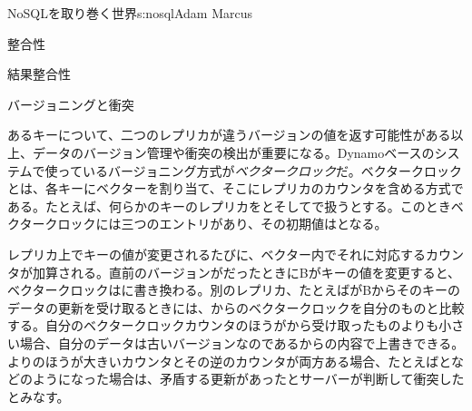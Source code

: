 \begin{aosachapter}{NoSQLを取り巻く世界}{s:nosql}{Adam Marcus}
\begin{aosasect1}{整合性}
\begin{aosasect2}{結果整合性}
\begin{aosasect3}{バージョニングと衝突}

あるキーについて、二つのレプリカが違うバージョンの値を返す可能性がある以上、データのバージョン管理や衝突の検出が重要になる。Dynamoベースのシステムで使っているバージョニング方式が\emph{ベクタークロック}だ。ベクタークロックとは、各キーにベクターを割り当て、そこにレプリカのカウンタを含める方式である。たとえば、何らかのキーのレプリカをとそしてで扱うとする。このときベクタークロックには三つのエントリがあり、その初期値はとなる。

レプリカ上でキーの値が変更されるたびに、ベクター内でそれに対応するカウンタが加算される。直前のバージョンがだったときにBがキーの値を変更すると、ベクタークロックはに書き換わる。別のレプリカ、たとえばがBからそのキーのデータの更新を受け取るときには、からのベクタークロックを自分のものと比較する。自分のベクタークロックカウンタのほうがから受け取ったものよりも小さい場合、自分のデータは古いバージョンなのであるからの内容で上書きできる。よりのほうが大きいカウンタとその逆のカウンタが両方ある場合、たとえばとなどのようになった場合は、矛盾する更新があったとサーバーが判断して衝突したとみなす。


\end{aosasect3}
\end{aosasect2}
\end{aosasect1}
\end{aosachapter}
